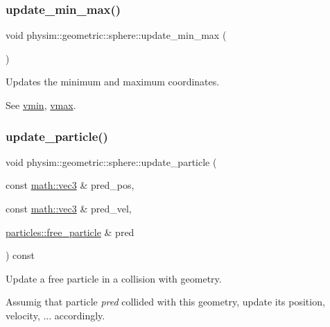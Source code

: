 \subsubsection{\texorpdfstring{update\+\_\+min\+\_\+max()}{update\_min\_max()}}
{\footnotesize\ttfamily void physim\+::geometric\+::sphere\+::update\+\_\+min\+\_\+max (\begin{DoxyParamCaption}{ }\end{DoxyParamCaption})\hspace{0.3cm}{\ttfamily [private]}}



Updates the minimum and maximum coordinates. 

See \hyperlink{classphysim_1_1geometric_1_1geometry_a5a573b2ff467d2fe492db9240eeff49a}{vmin}, \hyperlink{classphysim_1_1geometric_1_1geometry_a75eeb09e8584ff0d2109396baf0380d4}{vmax}. \mbox{\label{classphysim_1_1geometric_1_1sphere_a22318ec85e433ed92a0a9f90aed97b79}} 
\subsubsection{\texorpdfstring{update\+\_\+particle()}{update\_particle()}\hspace{0.1cm}{\footnotesize\ttfamily [1/2]}}
{\footnotesize\ttfamily void physim\+::geometric\+::sphere\+::update\+\_\+particle (\begin{DoxyParamCaption}\item[{const \hyperlink{structphysim_1_1math_1_1vec3}{math\+::vec3} \&}]{pred\+\_\+pos,  }\item[{const \hyperlink{structphysim_1_1math_1_1vec3}{math\+::vec3} \&}]{pred\+\_\+vel,  }\item[{\hyperlink{classphysim_1_1particles_1_1free__particle}{particles\+::free\+\_\+particle} \&}]{pred }\end{DoxyParamCaption}) const\hspace{0.3cm}{\ttfamily [virtual]}}



Update a free particle in a collision with geometry. 

Assumig that particle {\itshape pred} collided with this geometry, update its position, velocity, ... accordingly.

